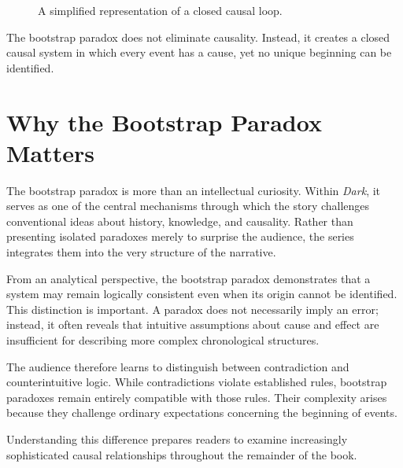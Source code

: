 \documentclass[12pt,oneside,openany]{book}
\begin{document}
\begin{figure}[H]
\centering
{}
\caption{A simplified representation of a closed causal loop.}
\end{figure}

\begin{tcolorbox}[colback=gray!8,colframe=black,title=Key Observation]
The bootstrap paradox does not eliminate causality. Instead, it creates a
closed causal system in which every event has a cause, yet no unique
beginning can be identified.
\end{tcolorbox}
\section{Why the Bootstrap Paradox Matters}

The bootstrap paradox is more than an intellectual curiosity. Within
\textit{Dark}, it serves as one of the central mechanisms through which the
story challenges conventional ideas about history, knowledge, and causality.
Rather than presenting isolated paradoxes merely to surprise the audience, the
series integrates them into the very structure of the narrative.

From an analytical perspective, the bootstrap paradox demonstrates that a
system may remain logically consistent even when its origin cannot be
identified. This distinction is important. A paradox does not necessarily imply
an error; instead, it often reveals that intuitive assumptions about cause and
effect are insufficient for describing more complex chronological structures.

The audience therefore learns to distinguish between contradiction and
counterintuitive logic. While contradictions violate established rules,
bootstrap paradoxes remain entirely compatible with those rules. Their
complexity arises because they challenge ordinary expectations concerning the
beginning of events.

Understanding this difference prepares readers to examine increasingly
sophisticated causal relationships throughout the remainder of the book.
\end{document}
